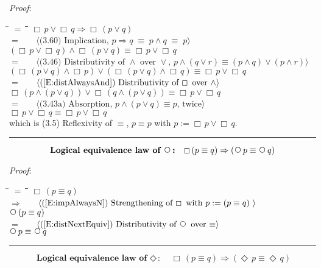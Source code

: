 \documentclass[12pt, fleqn, leqno]{article}
\newcommand{\lgap}{2pt}                             %
\newcommand{\mymathindent}{24pt}                    %
\newcommand{\equivs}{\ensuremath{\;\equiv\;}}       %
\newcommand{\impl}{\ensuremath{\Rightarrow}}        %
\newcommand{\Next}{\;\,\text{\raisebox{3.5pt}{\circle{6}}}}
\newcommand{\Event}{\Diamond\,}
\newcommand{\Always}{\Box\,}
\newcommand{\myqed}{\rule[-.23ex]{1.2ex}{2.0ex}}
\newcommand{\myqedtab}{\hspace{384pt}}              %
\newcommand{\Gll} {\langle}                         %
\newcommand{\Ggg} {\rangle}                         %
\newcommand{\Hint}[1]     {\ \ \ $\Gll              \mbox{#1} \Ggg$ }   %
\begin{document}
\emph{Proof}:
\begin{tabbing}
\hspace{\mymathindent} \= $= \;$ \= \myqedtab \= \kill
  \> \>   $\Always p \lor \Always q \impl \Always(p \lor q)$\\[\lgap]
  \> $=$  \>  \Hint{(3.60) Implication, $p\impl q \equivs p\land q \equivs p$}\\[\lgap]
  \> \>   $(\Always p \lor \Always q) \land \Always(p \lor q) \equiv \Always p \lor \Always q$\\[\lgap]
  \> $=$  \>  \Hint{(3.46) Distributivity of $\land$ over $\lor$, $p\land (q\lor r)\equiv (p\land q)\lor (p\land r)$}\\[\lgap]
  \> \>   $(\Always (p \lor q) \land \Always p) \lor (\Always (p \lor q) \land \Always q) \equiv \Always p \lor \Always q$\\[\lgap]
  \> $=$  \>  \Hint{(\ref{E:distAlwaysAnd}) Distributivity of $\Always$ over $\land$}\\[\lgap]
  \> \>   $\Always(p \land (p \lor q)) \lor \Always(q \land (p \lor q)) \equiv \Always p \lor \Always q$\\[\lgap]
  \> $=$  \>  \Hint{(3.43a) Absorption, $p \land (p \lor q) \equiv p$, twice}\\[\lgap]
  \> \>   $\Always p \lor \Always q \equiv \Always p \lor \Always q$\\[\lgap]
  \> which is (3.5) Reflexivity of $\equiv$, $p\equiv p$ with $p:=\Always p \lor \Always q$. \quad \myqed
\end{tabbing}

\begin{equation}\label{E:distNextEquiv2}
\textbf{Logical equivalence law of $\Next$:}\quad \Always (p \equiv q) \impl (\Next p \equiv \Next q)
\end{equation}

\emph{Proof}:
\begin{tabbing}
\hspace{\mymathindent} \= $= \;$ \= \myqedtab \= \kill
  \> \>   $\Always (p \equiv q) $\\[\lgap]
  \> $\impl$  \>  \Hint{(\ref{E:impAlwaysN}) Strengthening of $\Always$ with $p:=(p \equiv q)$ }\\[\lgap]
  \> \>   $\Next (p \equiv q) $\\[\lgap]
  \> $=$  \>  \Hint{(\ref{E:distNextEquiv}) Distributivity of $\Next$ over $\equiv$}\\[\lgap]
  \> \>   $\Next p \equiv  \Next q$\quad \myqed
\end{tabbing}
\begin{equation}\label{E:LELevent}
\textbf{Logical equivalence law of $\Event$:}\quad \Always (p \equiv q) \impl (\Event p \equiv \Event q)
\end{equation}
\end{document}
